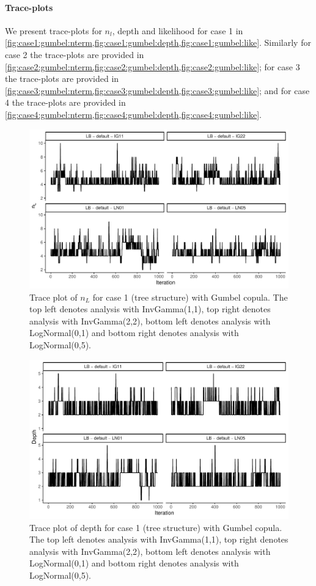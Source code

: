 \documentclass{amsart}
\begin{document}
\paragraph{Trace-plots} We present trace-plots for $n_l$, depth and likelihood for case 1 in \cref{fig:case1:gumbel:nterm,fig:case1:gumbel:depth,fig:case1:gumbel:like}. Similarly for case 2 the trace-plots are provided in \cref{fig:case2:gumbel:nterm,fig:case2:gumbel:depth,fig:case2:gumbel:like}; for case 3 the trace-plots are provided in \cref{fig:case3:gumbel:nterm,fig:case3:gumbel:depth,fig:case3:gumbel:like}; and for case 4 the trace-plots are provided in \cref{fig:case4:gumbel:nterm,fig:case4:gumbel:depth,fig:case4:gumbel:like}.


\begin{figure}
	\centering
	\includegraphics[width = 0.75\linewidth]{trace_case1_gumbel_nterm.pdf}
	\caption{Trace plot of $n_L$ for case 1 (tree structure) with Gumbel copula. The top left denotes analysis with InvGamma(1,1), top right denotes analysis with InvGamma(2,2), bottom left denotes analysis with LogNormal(0,1) and bottom right denotes analysis with LogNormal(0,5).}
	\label{fig:case1:gumbel:nterm}
\end{figure}

\begin{figure}
	\centering
	\includegraphics[width = 0.75\linewidth]{trace_case1_gumbel_depth.pdf}
	\caption{Trace plot of depth for case 1 (tree structure) with Gumbel copula. The top left denotes analysis with InvGamma(1,1), top right denotes analysis with InvGamma(2,2), bottom left denotes analysis with LogNormal(0,1) and bottom right denotes analysis with LogNormal(0,5).}
	\label{fig:case1:gumbel:depth}
\end{figure}
\end{document}
